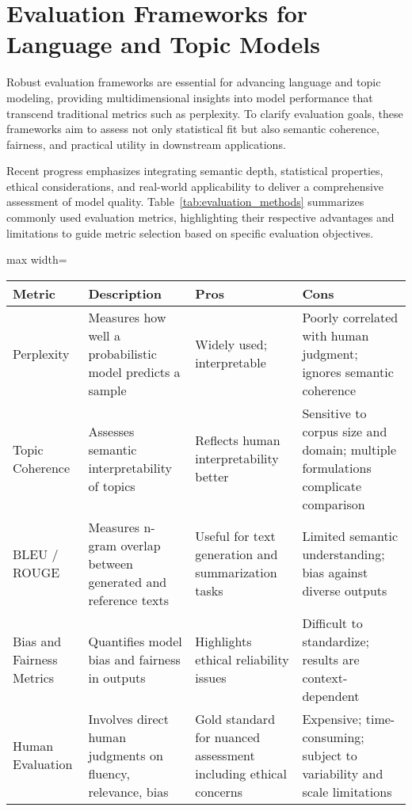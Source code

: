 \documentclass[sigconf]{acmart}
\begin{document}
\section{Evaluation Frameworks for Language and Topic Models}

Robust evaluation frameworks are essential for advancing language and topic modeling, providing multidimensional insights into model performance that transcend traditional metrics such as perplexity. To clarify evaluation goals, these frameworks aim to assess not only statistical fit but also semantic coherence, fairness, and practical utility in downstream applications.

Recent progress emphasizes integrating semantic depth, statistical properties, ethical considerations, and real-world applicability to deliver a comprehensive assessment of model quality. Table~\ref{tab:evaluation_methods} summarizes commonly used evaluation metrics, highlighting their respective advantages and limitations to guide metric selection based on specific evaluation objectives.

\begin{table*}[htbp]
\centering
\caption{Comparison of Evaluation Metrics for Language and Topic Models}
\label{tab:evaluation_methods}
\begin{adjustbox}{max width=\textwidth}
\begin{tabular}{@{}llll@{}}
\toprule
Metric & Description & Pros & Cons \\
\midrule
Perplexity & Measures how well a probabilistic model predicts a sample & Widely used; interpretable & Poorly correlated with human judgment; ignores semantic coherence \\
Topic Coherence & Assesses semantic interpretability of topics & Reflects human interpretability better & Sensitive to corpus size and domain; multiple formulations complicate comparison \\
BLEU / ROUGE & Measures n-gram overlap between generated and reference texts & Useful for text generation and summarization tasks & Limited semantic understanding; bias against diverse outputs \\
Bias and Fairness Metrics & Quantifies model bias and fairness in outputs & Highlights ethical reliability issues & Difficult to standardize; results are context-dependent \\
Human Evaluation & Involves direct human judgments on fluency, relevance, bias & Gold standard for nuanced assessment including ethical concerns & Expensive; time-consuming; subject to variability and scale limitations \\
\bottomrule
\end{tabular}
\end{adjustbox}
\end{table*}
\end{document}
